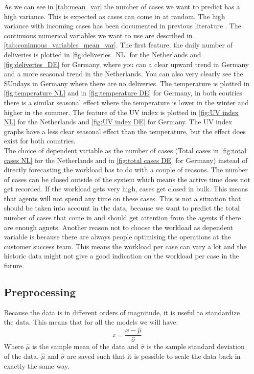 As we can see in \autoref{tab:mean_var} the number of cases we want to predict has a high variance. This is expected as cases can come in at random. The high variance with incoming cases has been documented in previous literature \citep{Stolletz2011ArticleManagement}. The continuous numerical variables we want to use are described in \autoref{tab:coninuous_variables_mean_var}. The first feature, the daily number of deliveries is plotted in \autoref{fig:deliveries_NL} for the Netherlands and \autoref{fig:deliveries_DE} for Germany,  where you can a clear upward trend in Germany and a more seasonal trend in the Netherlands. You can also very clearly see the SUndays in Germany where there are no deliveries. The temperature is plotted in \autoref{fig:temperature NL} and in \autoref{fig:temperature DE} for Germany, in both coutries there is a similar seasonal effect where the temperature is lower in the winter and higher in the summer. The feature of the UV index is plotted in \autoref{fig:UV index NL} for the Netherlands and \autoref{fig:UV index DE} for Germany. The UV index graphs have a less clear seasonal effect than the temperature, but the effect does exist for both countries.\\

The choice of dependent variable as the number of cases (Total cases in \autoref{fig:total cases NL} for the Netherlands and in \autoref{fig:total cases DE} for Germany) instead of directly forecasting the workload has to do with a couple of reasons. The number of cases can be closed outside of the system which means the active time does not get recorded. If the workload gets very high, cases get closed in bulk. This means that agents will not spend any time on these cases. This is not a situation that should be taken into account in the data, because we want to predict the total number of cases that come in and should get attention from the agents if there are enough agnets. Another reason not to choose the workload as dependent variable is because there are always people optimising the operations at the customer success team. This means the workload per case can vary a lot and the historic data might not give a good indication on the workload per case in the future.\\

\subsection{Preprocessing}
Because the data is in different orders of magnitude, it is useful to standardize the data. This means that for all the models we will have:
\begin{equation}
    z = \frac{x - \hat{\mu}}{\hat{\sigma}}
\end{equation}
Where $\hat{\mu}$ is the sample mean of the data and $\hat{\sigma}$ is the sample standard deviation of the data. $\hat{\mu}$ and $\hat{\sigma}$ are saved such that it is possible to scale the data back in exactly the same way.\\

